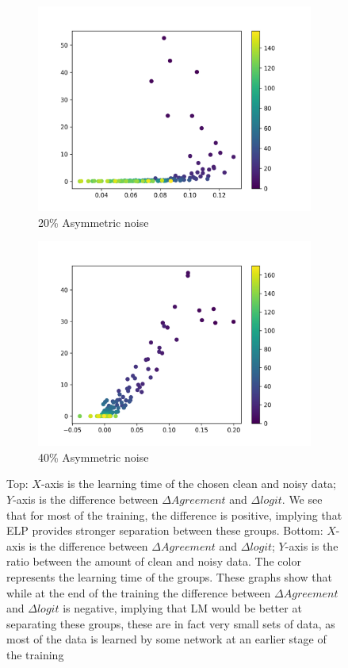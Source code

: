 \documentclass{article}
\begin{document}
\begin{figure}[h]
\begin{subfigure}[b]{0.22\textwidth}
        \includegraphics[width=\textwidth]{figs/Dense100_asym_20_scatter.png}
        \vspace{-.5cm}
        \caption{20\% Asymmetric noise}
    \end{subfigure}
    \begin{subfigure}[b]{0.22\textwidth}
        \includegraphics[width=\textwidth]{figs/Dense100_40_scatter.png}
        \vspace{-.5cm}
        \caption{40\% Asymmetric noise}
    \end{subfigure}
    \caption[Estimation]{Top: $X$-axis is the learning time of the chosen clean and noisy data; $Y$-axis is the difference between $\Delta Agreement$ and $\Delta logit$. We see that for most of the training, the difference is positive, implying that ELP provides stronger separation between these groups. Bottom: $X$-axis is the difference between $\Delta Agreement$ and $\Delta logit$; $Y$-axis is the ratio between the amount of clean and noisy data. The color represents the learning time of the groups. These graphs show that while at the end of the training the difference between $\Delta Agreement$ and $\Delta logit$ is negative, implying that LM would be better at separating these groups, these are in fact very small sets of data, as most of the data is learned by some network at an earlier stage of the training}

\end{figure}
\end{document}
